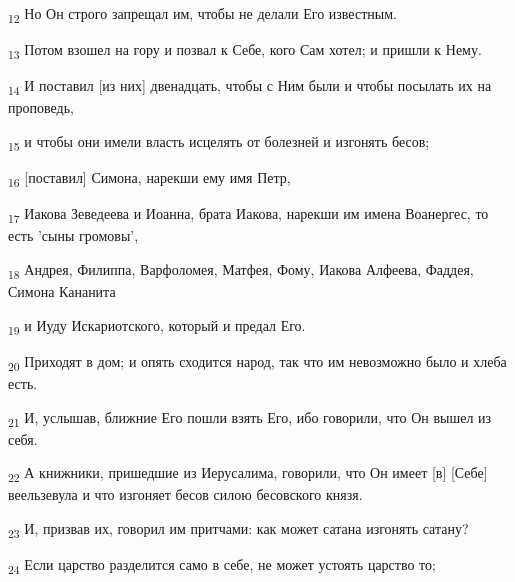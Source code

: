 \begin{tcolorbox}
\textsubscript{12} Но Он строго запрещал им, чтобы не делали Его известным.
\end{tcolorbox}
\begin{tcolorbox}
\textsubscript{13} Потом взошел на гору и позвал к Себе, кого Сам хотел; и пришли к Нему.
\end{tcolorbox}
\begin{tcolorbox}
\textsubscript{14} И поставил [из них] двенадцать, чтобы с Ним были и чтобы посылать их на проповедь,
\end{tcolorbox}
\begin{tcolorbox}
\textsubscript{15} и чтобы они имели власть исцелять от болезней и изгонять бесов;
\end{tcolorbox}
\begin{tcolorbox}
\textsubscript{16} [поставил] Симона, нарекши ему имя Петр,
\end{tcolorbox}
\begin{tcolorbox}
\textsubscript{17} Иакова Зеведеева и Иоанна, брата Иакова, нарекши им имена Воанергес, то есть 'сыны громовы',
\end{tcolorbox}
\begin{tcolorbox}
\textsubscript{18} Андрея, Филиппа, Варфоломея, Матфея, Фому, Иакова Алфеева, Фаддея, Симона Кананита
\end{tcolorbox}
\begin{tcolorbox}
\textsubscript{19} и Иуду Искариотского, который и предал Его.
\end{tcolorbox}
\begin{tcolorbox}
\textsubscript{20} Приходят в дом; и опять сходится народ, так что им невозможно было и хлеба есть.
\end{tcolorbox}
\begin{tcolorbox}
\textsubscript{21} И, услышав, ближние Его пошли взять Его, ибо говорили, что Он вышел из себя.
\end{tcolorbox}
\begin{tcolorbox}
\textsubscript{22} А книжники, пришедшие из Иерусалима, говорили, что Он имеет [в] [Себе] веельзевула и что изгоняет бесов силою бесовского князя.
\end{tcolorbox}
\begin{tcolorbox}
\textsubscript{23} И, призвав их, говорил им притчами: как может сатана изгонять сатану?
\end{tcolorbox}
\begin{tcolorbox}
\textsubscript{24} Если царство разделится само в себе, не может устоять царство то;
\end{tcolorbox}
